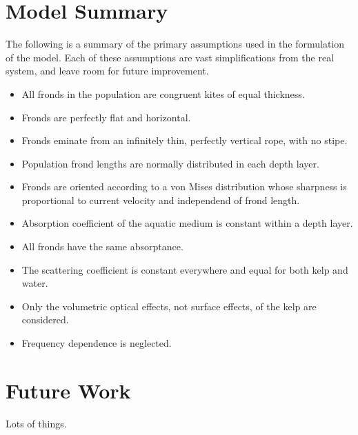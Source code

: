 \section{Model Summary}
The following is a summary of the primary assumptions used in the formulation of the model.
Each of these assumptions are vast simplifications from the real system, and leave room for future improvement.
\begin{itemize}
  \item All fronds in the population are congruent kites of equal thickness.
  \item Fronds are perfectly flat and horizontal.
  \item Fronds eminate from an infinitely thin, perfectly vertical rope, with no stipe.
  \item Population frond lengths are normally distributed in each depth layer.
  \item Fronds are oriented according to a von Mises distribution whose sharpness is proportional to current velocity and independend of frond length.
  \item Absorption coefficient of the aquatic medium is constant within a depth layer.
  \item All fronds have the same absorptance.
  \item The scattering coefficient is constant everywhere and equal for both kelp and water.
  \item Only the volumetric optical effects, not surface effects, of the kelp are considered.
  \item Frequency dependence is neglected.
\end{itemize}


\section{Future Work}
Lots of things.
